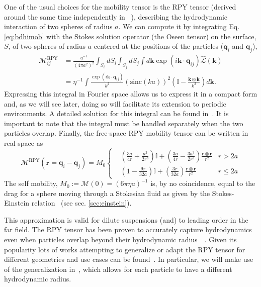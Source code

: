 \documentclass[ twoside,openright,titlepage,numbers=noenddot,%
headinclude,footinclude,cleardoublepage=empty,abstract=on,
BCOR=5mm,paper=b5,fontsize=11pt, dvipsnames
]{scrreprt}
\renewcommand{\vec}[1]{\bm{#1}}
\newcommand{\tens}[1]{\bm{\mathcal{#1}}}
\newcommand{\oper}[1]{\mathcal{#1}}
\newcommand{\sinc}{\textrm{sinc}}
\newcommand{\ppos}{q}
\begin{document}
One of the usual choices for the mobility tensor is the \gls{RPY} tensor (derived around the same time independently in ~\cite{Rotne1969,Yamakawa1970}), describing the hydrodynamic interaction of two spheres of radius $a$. We can compute it by integrating Eq. \eqref{eq:bdhimob} with the Stokes solution operator (the Oseen tensor) on the surface, $S$, of two spheres of radius $a$ centered at the positions of the particles ($\vec{\ppos}_i$ and $\vec{\ppos}_j$),
\begin{equation}
  \label{eq:rpymobfour}
  \begin{aligned}
    \tens{M}_{ij}^{\textrm{RPY}} &= \frac{\eta^{-1}}{(4\pi a^2)^2} \int_{S_i}dS_i\int_{S_j}dS_j \int d\vec{k} \exp(i\vec{k}\cdot\vec{\ppos}_{ij})\hat{\oper{L}}(\vec{k})\\
    &= \eta^{-1} \int \frac{\exp(i\vec{k}\cdot\vec{\ppos}_{ij})}{k^2}\left(\sinc(ka) \right)^2\left(\mathbb{I} - \frac{\vec{k}\otimes\vec{k}}{k^2}\right)d\vec{k}.
\end{aligned}
\end{equation}
Expressing this integral in Fourier space allows us to express it in a compact form and, as we will see later, doing so will facilitate its extension to periodic environments.
A detailed solution for this integral can be found in~\cite{Wajnryb2013}. It is important to note that the integral must be handled separately when the two particles overlap.
Finally, the free-space \gls{RPY} mobility tensor can be written in real space as~\cite{Wajnryb2013}
\begin{equation}
  \label{eq:rpy}
  \tens{M}^{\textrm{RPY}}(\vec{r} = \vec{q}_i-\vec{q}_j) = M_0\left\{
  \begin{aligned}
    &\left( \frac{3a}{4r} + \frac{a^3}{2r^3} \right)\mathbb{I} + \left(\frac{3a}{4r} - \frac{3a^3}{2r^3}\right)\frac{\vec{r}\otimes\vec{r}}{r^2}  & r > 2a\\
    &\left(1 - \frac{9r}{32a} \right)\mathbb{I} + \left( \frac{3r}{32a} \right)\frac{\vec{r}\otimes\vec{r}}{r^2} & r \le 2a
  \end{aligned}\right.
\end{equation}
The self mobility, $M_0 := \tens{M}(0) = (6\pi\eta a)^{-1}$ is, by no coincidence, equal to the drag for a sphere moving through a Stokesian fluid as given by the Stokes-Einstein relation~\cite{Dhont1996} (see sec. \ref{sec:einstein}).

This approximation is valid for dilute suspensions (and) to leading order in the far field. The \gls{RPY} tensor has been proven to accurately capture hydrodynamics even when particles overlap beyond their hydrodynamic radius~\cite{Ermak1978}~\cite{Wajnryb2013}.
Given its popularity lots of works attempting to generalize or adapt the \gls{RPY} tensor for different geometries and use cases can be found~\cite{Wajnryb2013,Liang2013,Guan2018,Fiore2017}. In particular, we will make use of the generalization in~\cite{Zuk2014}, which allows for each particle to have a different hydrodynamic radius.
\end{document}
